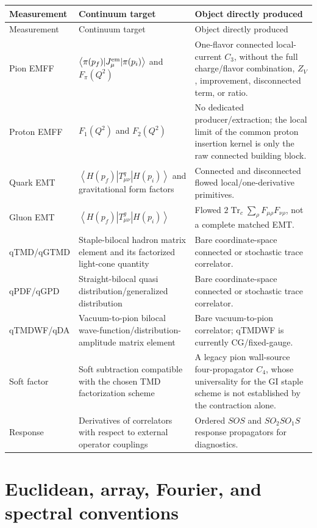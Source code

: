 \documentclass[11pt,a4paper]{article}
\numberwithin{equation}{section}
\newcommand{\Tr}{\operatorname{Tr}}
\newcommand{\avg}[1]{\left\langle #1\right\rangle}
\begin{document}
\begin{longtable}{L{0.16\textwidth}L{0.31\textwidth}L{0.43\textwidth}}
\toprule
Measurement & Continuum target & Object directly produced \\
\midrule
\endfirsthead
\toprule
Measurement & Continuum target & Object directly produced \\
\midrule
\endhead
Pion EMFF &
\(\avg{\pi(p_f)|J_\mu^{\rm em}|\pi(p_i)}\) and \(F_\pi(Q^2)\) &
One-flavor connected local-current \(C_3\), without the full charge/flavor
combination, \(Z_V\), improvement, disconnected term, or ratio.\\
Proton EMFF &
\(F_1(Q^2)\) and \(F_2(Q^2)\) &
No dedicated producer/extraction; the local limit of the common proton
insertion kernel is only the raw connected building block.\\
Quark EMT &
\(\avg{H(p_f)|T_{\mu\nu}^q|H(p_i)}\) and gravitational form factors &
Connected and disconnected flowed local/one-derivative primitives.\\
Gluon EMT &
\(\avg{H(p_f)|T_{\mu\nu}^g|H(p_i)}\) &
Flowed \(2\Tr_c\sum_\rho F_{\mu\rho}F_{\nu\rho}\), not a complete matched EMT.\\
qTMD/\allowbreak qGTMD &
Staple-bilocal hadron matrix element and its factorized light-cone quantity &
Bare coordinate-space connected or stochastic trace correlator.\\
qPDF/qGPD &
Straight-bilocal quasi distribution/generalized distribution &
Bare coordinate-space connected or stochastic trace correlator.\\
qTMDWF/\allowbreak qDA &
Vacuum-to-pion bilocal wave-function/distribution-amplitude matrix element &
Bare vacuum-to-pion correlator; qTMDWF is currently CG/fixed-gauge.\\
Soft factor &
Soft subtraction compatible with the chosen TMD factorization scheme &
A legacy pion wall-source four-propagator \(C_4\), whose universality for the
GI staple scheme is not established by the contraction alone.\\
Response &
Derivatives of correlators with respect to external operator couplings &
Ordered \(SOS\) and \(SO_2SO_1S\) response propagators for diagnostics.\\
\bottomrule
\end{longtable}

\section{Euclidean, array, Fourier, and spectral conventions}
\end{document}
